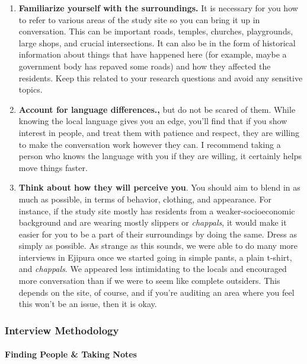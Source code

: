 \documentclass[
]{latex/krantz}
\begin{document}
\begin{enumerate}
\def\labelenumi{\arabic{enumi}.}
\item
  \textbf{Familiarize yourself with the surroundings.} It is necessary for you how to refer to various areas of the study site so you can bring it up in conversation. This can be important roads, temples, churches, playgrounds, large shops, and crucial intersections. It can also be in the form of historical information about things that have happened here (for example, maybe a government body has repaved some roads) and how they affected the residents. Keep this related to your research questions and avoid any sensitive topics.
\item
  \textbf{Account for language differences.,} but do not be scared of them. While knowing the local language gives you an edge, you'll find that if you show interest in people, and treat them with patience and respect, they are willing to make the conversation work however they can. I recommend taking a person who knows the language with you if they are willing, it certainly helps move things faster.
\item
  \textbf{Think about how they will perceive you}. You should aim to blend in as much as possible, in terms of behavior, clothing, and appearance. For instance, if the study site mostly has residents from a weaker-socioeconomic background and are wearing mostly slippers or \emph{chappals}, it would make it easier for you to be a part of their surroundings by doing the same. Dress as simply as possible. As strange as this sounds, we were able to do many more interviews in Ejipura once we started going in simple pants, a plain t-shirt, and \emph{chappals}. We appeared less intimidating to the locals and encouraged more conversation than if we were to seem like complete outsiders. This depends on the site, of course, and if you're auditing an area where you feel this won't be an issue, then it is okay.
\end{enumerate}

\hypertarget{interview-methodology}{%
\subsubsection{Interview Methodology}\label{interview-methodology}}

\hypertarget{finding-people}{%
\paragraph{Finding People \& Taking Notes}\label{finding-people}}
\end{document}
